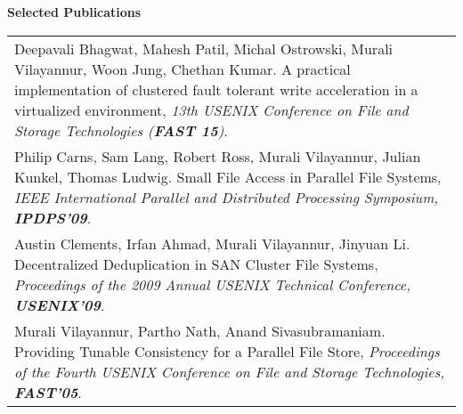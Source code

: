 \documentclass{article}
\begin{document}

\vspace*{-0.1truein}
  \large \textbf{Selected Publications}
  \normalsize
\vspace*{-0.1truein}

  \begin{center}
  \begin{tabularx}{6.2in}{X}
  {Deepavali Bhagwat, Mahesh Patil, Michal Ostrowski, Murali Vilayannur, Woon
     Jung, Chethan Kumar. A practical implementation of clustered fault
     tolerant write acceleration in a virtualized environment,
  \emph {13th USENIX Conference on File and Storage Technologies ({\bf FAST 15})}}. \\
  {Philip Carns, Sam Lang, Robert Ross, Murali Vilayannur, Julian Kunkel, Thomas Ludwig.
     Small File Access in Parallel File Systems,
   \emph {IEEE International Parallel and Distributed Processing Symposium,
{\bf IPDPS'09}}}. \\
  {Austin Clements, Irfan Ahmad, Murali Vilayannur, Jinyuan Li.
     Decentralized Deduplication in SAN Cluster File Systems,
   \emph {Proceedings of the 2009 Annual USENIX Technical Conference,
{\bf USENIX'09}}}. \\
  Murali Vilayannur, Partho Nath, Anand Sivasubramaniam.
  Providing Tunable Consistency for a Parallel File Store,
  \emph {Proceedings of the Fourth USENIX Conference on File and Storage Technologies,
  {\bf FAST'05}}.\\

\end{tabularx}
\end{center}
\end{document}
